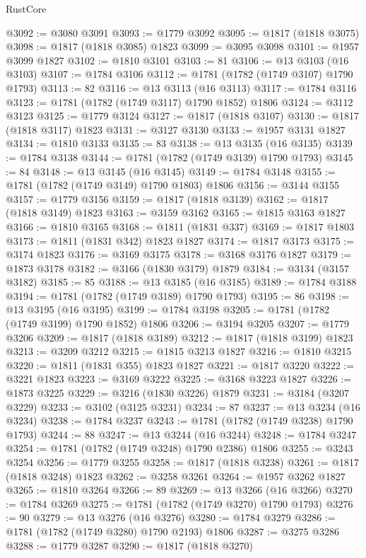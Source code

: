 \begin{lexlean}{RustCore}
\begin{coremodule}
@3092 := @3080 @3091
@3093 := @1779 @3092
@3095 := @1817 (@1818 @3075)
@3098 := @1817 (@1818 @3085) @1823
@3099 := @3095 @3098
@3101 := @1957 @3099 @1827
@3102 := @1810 @3101
@3103 := 81
@3106 := @13 @3103 (@16 @3103)
@3107 := @1784 @3106
@3112 := @1781 (@1782 (@1749 @3107) @1790 @1793)
@3113 := 82
@3116 := @13 @3113 (@16 @3113)
@3117 := @1784 @3116
@3123 := @1781 (@1782 (@1749 @3117) @1790 @1852) @1806
@3124 := @3112 @3123
@3125 := @1779 @3124
@3127 := @1817 (@1818 @3107)
@3130 := @1817 (@1818 @3117) @1823
@3131 := @3127 @3130
@3133 := @1957 @3131 @1827
@3134 := @1810 @3133
@3135 := 83
@3138 := @13 @3135 (@16 @3135)
@3139 := @1784 @3138
@3144 := @1781 (@1782 (@1749 @3139) @1790 @1793)
@3145 := 84
@3148 := @13 @3145 (@16 @3145)
@3149 := @1784 @3148
@3155 := @1781 (@1782 (@1749 @3149) @1790 @1803) @1806
@3156 := @3144 @3155
@3157 := @1779 @3156
@3159 := @1817 (@1818 @3139)
@3162 := @1817 (@1818 @3149) @1823
@3163 := @3159 @3162
@3165 := @1815 @3163 @1827
@3166 := @1810 @3165
@3168 := @1811 (@1831 @337)
@3169 := @1817 @1803
@3173 := @1811 (@1831 @342) @1823 @1827
@3174 := @1817 @3173
@3175 := @3174 @1823
@3176 := @3169 @3175
@3178 := @3168 @3176 @1827
@3179 := @1873 @3178
@3182 := @3166 (@1830 @3179) @1879
@3184 := @3134 (@3157 @3182)
@3185 := 85
@3188 := @13 @3185 (@16 @3185)
@3189 := @1784 @3188
@3194 := @1781 (@1782 (@1749 @3189) @1790 @1793)
@3195 := 86
@3198 := @13 @3195 (@16 @3195)
@3199 := @1784 @3198
@3205 := @1781 (@1782 (@1749 @3199) @1790 @1852) @1806
@3206 := @3194 @3205
@3207 := @1779 @3206
@3209 := @1817 (@1818 @3189)
@3212 := @1817 (@1818 @3199) @1823
@3213 := @3209 @3212
@3215 := @1815 @3213 @1827
@3216 := @1810 @3215
@3220 := @1811 (@1831 @355) @1823 @1827
@3221 := @1817 @3220
@3222 := @3221 @1823
@3223 := @3169 @3222
@3225 := @3168 @3223 @1827
@3226 := @1873 @3225
@3229 := @3216 (@1830 @3226) @1879
@3231 := @3184 (@3207 @3229)
@3233 := @3102 (@3125 @3231)
@3234 := 87
@3237 := @13 @3234 (@16 @3234)
@3238 := @1784 @3237
@3243 := @1781 (@1782 (@1749 @3238) @1790 @1793)
@3244 := 88
@3247 := @13 @3244 (@16 @3244)
@3248 := @1784 @3247
@3254 := @1781 (@1782 (@1749 @3248) @1790 @2386) @1806
@3255 := @3243 @3254
@3256 := @1779 @3255
@3258 := @1817 (@1818 @3238)
@3261 := @1817 (@1818 @3248) @1823
@3262 := @3258 @3261
@3264 := @1957 @3262 @1827
@3265 := @1810 @3264
@3266 := 89
@3269 := @13 @3266 (@16 @3266)
@3270 := @1784 @3269
@3275 := @1781 (@1782 (@1749 @3270) @1790 @1793)
@3276 := 90
@3279 := @13 @3276 (@16 @3276)
@3280 := @1784 @3279
@3286 := @1781 (@1782 (@1749 @3280) @1790 @2193) @1806
@3287 := @3275 @3286
@3288 := @1779 @3287
@3290 := @1817 (@1818 @3270)

\end{coremodule}
\end{lexlean}
